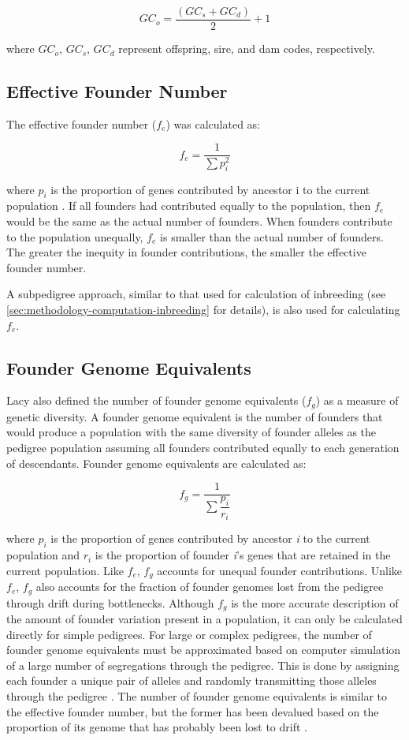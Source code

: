 \[ GC_o = \dfrac{ ( GC_s + GC_d ) } { 2 } + 1 \]

where $GC_o$, $GC_s$, $GC_d$ represent offspring, sire, and dam codes, respectively.
\subsection{Effective Founder Number}
\label{sec:methodology-computation-effective-founder-number}
The effective founder number ($f_e$) was calculated as:

\[ f_e = \dfrac{ 1 } { \sum{ p_i^2 } } \]

where $p_i$ is the proportion of genes contributed by ancestor i to the current population \cite{ref640}. If all founders
had contributed equally to the population, then $f_e$ would be the same as the actual number of founders.  When founders
contribute to the population unequally, $f_e$ is smaller than the actual number of founders. The greater the inequity in
founder contributions, the smaller the effective founder number.

A subpedigree approach, similar to that used for calculation of inbreeding (see \ref{sec:methodology-computation-inbreeding} for details), is also used for calculating $f_e$.
\subsection{Founder Genome Equivalents}
\label{sec:methodology-computation-founder-genome-equivalents}
Lacy \citeyear{ref640} also defined the number of founder genome equivalents ($f_g$) as a measure of genetic diversity.  A
founder genome equivalent is the number of founders that would produce a population with the same diversity of founder alleles
as the pedigree population assuming all founders contributed equally to each generation of descendants. Founder genome
equivalents are calculated as:

\[ f_g = \dfrac{ 1 } { \sum{ \dfrac{p_i} {r_i} } } \]

where $p_i$ is the proportion of genes contributed by ancestor \textit{i} to the current population and $r_i$ is the
proportion of founder \textit{i}'s genes that are retained in the current population.  Like $f_e$, $f_g$ accounts for
unequal founder contributions.  Unlike $f_e$, $f_g$ also accounts for the fraction of founder genomes lost from the
pedigree through drift during bottlenecks. Although $f_g$ is the more accurate description of the amount of founder variation
present in a population, it can only be calculated directly for simple pedigrees. For large or complex pedigrees, the number of
founder genome equivalents must be approximated based on computer simulation of a large number of segregations through the
pedigree. This is done by assigning each founder a unique pair of alleles and randomly transmitting those alleles through the
pedigree \cite{ref1719}. The number of founder genome equivalents is similar to the effective founder number, but the former
has been devalued based on the proportion of its genome that has probably been lost to drift \cite{ref640}.

